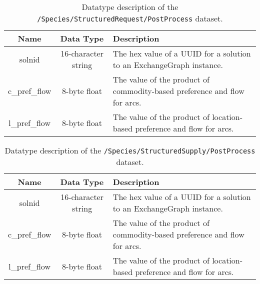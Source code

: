 \begin{table}[h!]
\centering
\label{tbl:/Species/StructuredRequest/PostProcess}
\caption{Datatype description of the \lstinline[basicstyle=\ttfamily\color{black}]|/Species/StructuredRequest/PostProcess| dataset.}
\begin{tabularx}{\columnwidth-10pt}{|c|c|X|} %
\hline
\textbf{Name} & \textbf{Data Type} & \textbf{Description}       \\ \hline
solnid & 16-character string & The hex value of a UUID for a solution to an ExchangeGraph instance. \\ \hline
c\_pref\_flow & 8-byte float & The value of the product of commodity-based preference and flow for arcs. \\ \hline
l\_pref\_flow & 8-byte float & The value of the product of location-based preference and flow for arcs. \\ \hline
\end{tabularx}
\end{table}

\begin{table}[h!]
\centering
\caption{
\label{tbl:/Species/StructuredSupply/PostProcess}
Datatype description of the \lstinline[basicstyle=\ttfamily\color{black}]|/Species/StructuredSupply/PostProcess| dataset.}
\begin{tabularx}{\columnwidth-10pt}{|c|c|X|} %
\hline
\textbf{Name} & \textbf{Data Type} & \textbf{Description}       \\ \hline
solnid & 16-character string & The hex value of a UUID for a solution to an ExchangeGraph instance. \\ \hline
c\_pref\_flow & 8-byte float & The value of the product of commodity-based preference and flow for arcs. \\ \hline
l\_pref\_flow & 8-byte float & The value of the product of location-based preference and flow for arcs. \\ \hline
\end{tabularx}
\end{table}

